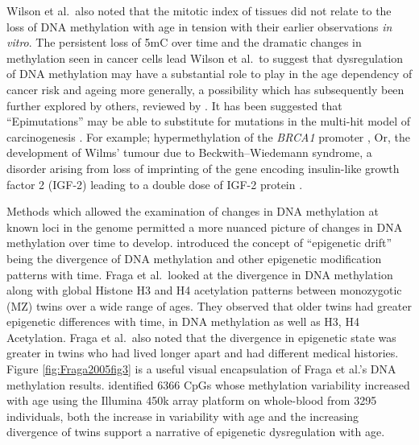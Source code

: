 \documentclass[]{book}
\begin{document}
Wilson et al.~also noted that the mitotic index of tissues did not relate to the loss of DNA methylation with age in tension with their earlier observations \emph{in vitro}. The persistent loss of 5mC over time and the dramatic changes in methylation seen in cancer cells lead Wilson et al.~to suggest that dysregulation of DNA methylation may have a substantial role to play in the age dependency of cancer risk and ageing more generally, a possibility which has subsequently been further explored by others, reviewed by \citet{Feinberg2004}. It has been suggested that ``Epimutations'' may be able to substitute for mutations in the multi-hit model of carcinogenesis \citep{Knudson1971}. For example; hypermethylation of the \emph{BRCA1} promoter \citep{Esteller2000}, Or, the development of Wilms' tumour due to Beckwith--Wiedemann syndrome, a disorder arising from loss of imprinting of the gene encoding insulin-like growth factor 2 (IGF-2) leading to a double dose of IGF-2 protein \citep{Feinberg2018}.

Methods which allowed the examination of changes in DNA methylation at known loci in the genome permitted a more nuanced picture of changes in DNA methylation over time to develop. \citet{Fraga2005} introduced the concept of ``epigenetic drift'' being the divergence of DNA methylation and other epigenetic modification patterns with time. Fraga et al.~looked at the divergence in DNA methylation along with global Histone H3 and H4 acetylation patterns between monozygotic (MZ) twins over a wide range of ages. They observed that older twins had greater epigenetic differences with time, in DNA methylation as well as H3, H4 Acetylation. Fraga et al.~also noted that the divergence in epigenetic state was greater in twins who had lived longer apart and had different medical histories. Figure \ref{fig:Fraga2005fig3} is a useful visual encapsulation of Fraga et al.'s DNA methylation results. \citet{Slieker2016} identified 6366 CpGs whose methylation variability increased with age using the Illumina 450k array platform on whole-blood from 3295 individuals, both the increase in variability with age and the increasing divergence of twins support a narrative of epigenetic dysregulation with age.
\end{document}
